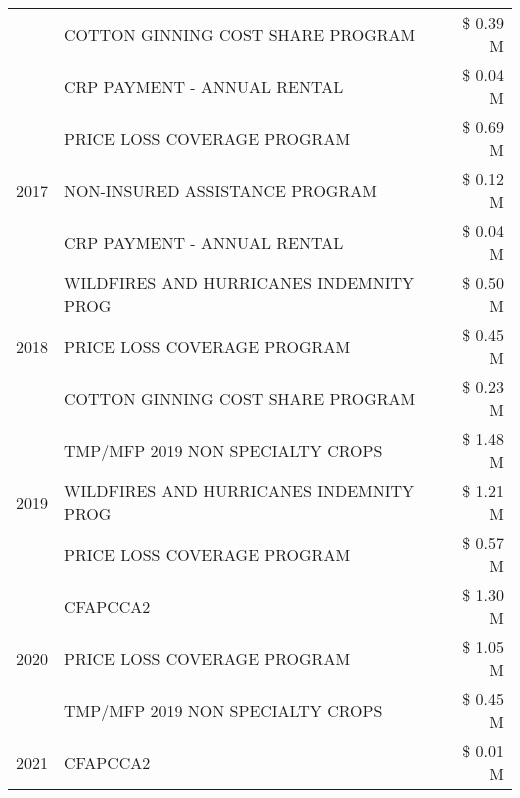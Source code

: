 \begin{tabular}{llr}
 & COTTON GINNING COST SHARE PROGRAM             & \$ 0.39 M \\
 & CRP PAYMENT - ANNUAL RENTAL                   & \$ 0.04 M \\
\cline{1-3}
\multirow[t]{3}{*}{2017} & PRICE LOSS COVERAGE PROGRAM & \$ 0.69 M \\
 & NON-INSURED ASSISTANCE PROGRAM & \$ 0.12 M \\
 & CRP PAYMENT - ANNUAL RENTAL & \$ 0.04 M \\
\cline{1-3}
\multirow[t]{3}{*}{2018} & WILDFIRES AND HURRICANES INDEMNITY PROG & \$ 0.50 M \\
 & PRICE LOSS COVERAGE PROGRAM & \$ 0.45 M \\
 & COTTON GINNING COST SHARE PROGRAM & \$ 0.23 M \\
\cline{1-3}
\multirow[t]{3}{*}{2019} & TMP/MFP 2019 NON SPECIALTY CROPS & \$ 1.48 M \\
 & WILDFIRES AND HURRICANES INDEMNITY PROG & \$ 1.21 M \\
 & PRICE LOSS COVERAGE PROGRAM & \$ 0.57 M \\
\cline{1-3}
\multirow[t]{3}{*}{2020} & CFAPCCA2 & \$ 1.30 M \\
 & PRICE LOSS COVERAGE PROGRAM & \$ 1.05 M \\
 & TMP/MFP 2019 NON SPECIALTY CROPS & \$ 0.45 M \\
\cline{1-3}
2021 & CFAPCCA2 & \$ 0.01 M \\
\cline{1-3}
\bottomrule
\end{tabular}
